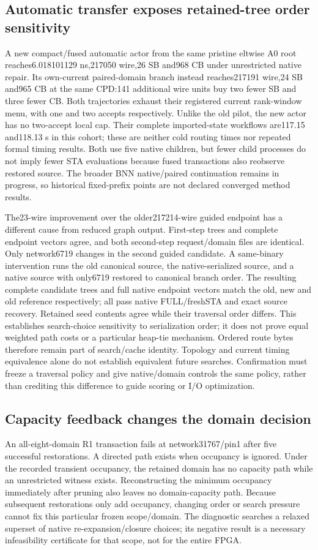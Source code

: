 \documentclass[conference,10pt]{IEEEtran}
\begin{document}
\subsection{Automatic transfer exposes retained-tree order sensitivity}
A new compact/fused automatic actor from the same pristine eltwise A0 root reaches6.018101129 ns,217050 wire,26 SB and968 CB under unrestricted native repair. Its own-current paired-domain branch instead reaches217191 wire,24 SB and965 CB at the same CPD:141 additional wire units buy two fewer SB and three fewer CB. Both trajectories exhaust their registered current rank-window menu, with one and two accepts respectively. Unlike the old pilot, the new actor has no two-accept local cap. Their complete imported-state workflows are117.15 and118.13 s in this cohort; these are neither cold routing times nor repeated formal timing results. Both use five native children, but fewer child processes do not imply fewer STA evaluations because fused transactions also reobserve restored source. The broader BNN native/paired continuation remains in progress, so historical fixed-prefix points are not declared converged method results.

The23-wire improvement over the older217214-wire guided endpoint has a different cause from reduced graph output. First-step trees and complete endpoint vectors agree, and both second-step request/domain files are identical. Only network6719 changes in the second guided candidate. A same-binary intervention runs the old canonical source, the native-serialized source, and a native source with only6719 restored to canonical branch order. The resulting complete candidate trees and full native endpoint vectors match the old, new and old reference respectively; all pass native FULL/freshSTA and exact source recovery. Retained seed contents agree while their traversal order differs. This establishes search-choice sensitivity to serialization order; it does not prove equal weighted path costs or a particular heap-tie mechanism. Ordered route bytes therefore remain part of search/cache identity. Topology and current timing equivalence alone do not establish equivalent future searches. Confirmation must freeze a traversal policy and give native/domain controls the same policy, rather than crediting this difference to guide scoring or I/O optimization.

\subsection{Capacity feedback changes the domain decision}
An all-eight-domain R1 transaction fails at network31767/pin1 after five successful restorations. A directed path exists when occupancy is ignored. Under the recorded transient occupancy, the retained domain has no capacity path while an unrestricted witness exists. Reconstructing the minimum occupancy immediately after pruning also leaves no domain-capacity path. Because subsequent restorations only add occupancy, changing order or search pressure cannot fix this particular frozen scope/domain. The diagnostic searches a relaxed superset of native re-expansion/closure choices; its negative result is a necessary infeasibility certificate for that scope, not for the entire FPGA.
\end{document}
